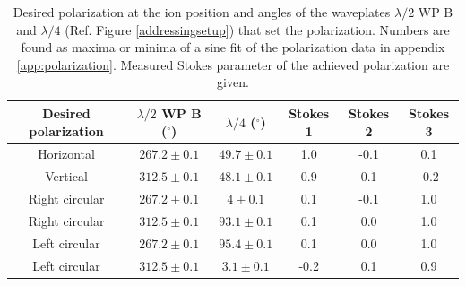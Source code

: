 \begin{table}
\centering
\begin{tabular}{c c c c c c}
 \toprule
    {Desired polarization} & {$\lambda/2$ WP B ($^\circ$)} & {$\lambda/4$ ($^\circ$)} & Stokes 1 & Stokes 2 & Stokes 3\\ \midrule\midrule
   Horizontal & $267.2\pm 0.1$ & $49.7\pm0.1$ & 1.0 & -0.1 & 0.1\\
   Vertical   & $312.5\pm0.1$ & $48.1\pm0.1$ &  0.9 &  0.1 & -0.2 \\ \midrule
   Right circular & $267.2\pm 0.1$ & $4\pm 0.1$ &  0.1 & -0.1 & 1.0 \\
   Right circular & $312.5\pm0.1$ & $93.1\pm0.1$ & 0.1 & 0.0 & 1.0  \\\midrule
  Left circular & $267.2\pm 0.1$ & $95.4\pm0.1$ &  0.1 & 0.0 & 1.0  \\
    Left circular & $312.5\pm0.1$  & $3.1\pm0.1$ &  -0.2 & 0.1 & 0.9  \\ \bottomrule
\end{tabular}
\caption{Desired polarization at the ion position and angles of the waveplates $\lambda/2$ WP B and $\lambda/4$ (Ref. Figure \ref{addressingsetup}) that set the polarization. Numbers are found as maxima or minima of a sine fit of the polarization data in appendix \ref{app:polarization}. Measured Stokes parameter of the achieved polarization are given.}
\label{polarizationstable}
\end{table}

